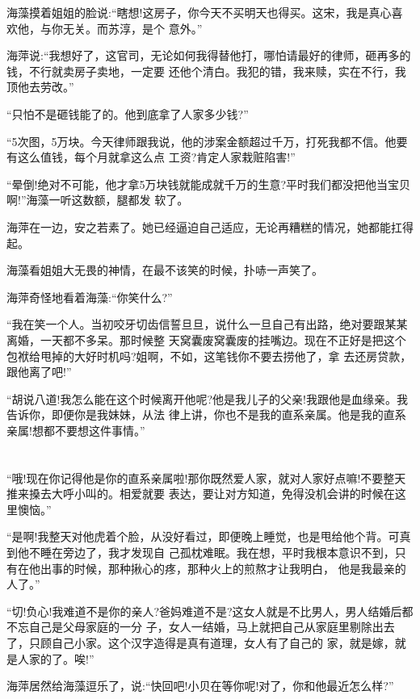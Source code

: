\documentclass[11pt,a4paper,onecolumn]{article}
\begin{document}
海藻摸着姐姐的脸说:``瞎想!这房子，你今天不买明天也得买。这宋，我是真心喜欢他，与你无关。而苏淳，是个
意外。''

海萍说:``我想好了，这官司，无论如何我得替他打，哪怕请最好的律师，砸再多的钱，不行就卖房子卖地，一定要
还他个清白。我犯的错，我来赎，实在不行，我顶他去劳改。''

``只怕不是砸钱能了的。他到底拿了人家多少钱?''

``5次图，5万块。今天律师跟我说，他的涉案金额超过千万，打死我都不信。他要有这么值钱，每个月就拿这么点
工资?肯定人家栽赃陷害!''

``晕倒!绝对不可能，他才拿5万块钱就能成就千万的生意?平时我们都没把他当宝贝啊!''海藻一听这数额，腿都发
软了。

海萍在一边，安之若素了。她已经逼迫自己适应，无论再糟糕的情况，她都能扛得起。

海藻看姐姐大无畏的神情，在最不该笑的时候，扑哧一声笑了。

海萍奇怪地看着海藻:``你笑什么?''

``我在笑一个人。当初咬牙切齿信誓旦旦，说什么一旦自己有出路，绝对要跟某某离婚，一天都不多呆。那时候整
天窝囊废窝囊废的挂嘴边。现在不正好是把这个包袱给甩掉的大好时机吗?姐啊，不如，这笔钱你不要去捞他了，拿
去还房贷款，跟他离了吧!''

``胡说八道!我怎么能在这个时候离开他呢?他是我儿子的父亲!我跟他是血缘亲。我告诉你，即便你是我妹妹，从法
律上讲，你也不是我的直系亲属。他是我的直系亲属!想都不要想这件事情。''

\section[\thesection]{}

``哦!现在你记得他是你的直系亲属啦!那你既然爱人家，就对人家好点嘛!不要整天推来搡去大呼小叫的。相爱就要
表达，要让对方知道，免得没机会讲的时候在这里懊恼。''

``是啊!我整天对他虎着个脸，从没好看过，即便晚上睡觉，也是甩给他个背。可真到他不睡在旁边了，我才发现自
己孤枕难眠。我在想，平时我根本意识不到，只有在他出事的时候，那种揪心的疼，那种火上的煎熬才让我明白，
他是我最亲的人了。''

``切!负心!我难道不是你的亲人?爸妈难道不是?这女人就是不比男人，男人结婚后都不忘自己是父母家庭的一分
子，女人一结婚，马上就把自己从家庭里剔除出去了，只顾自己小家。这个汉字造得是真有道理，女人有了自己的
家，就是嫁，就是人家的了。唉!''

海萍居然给海藻逗乐了，说:``快回吧!小贝在等你呢!对了，你和他最近怎么样?''
\end{document}
